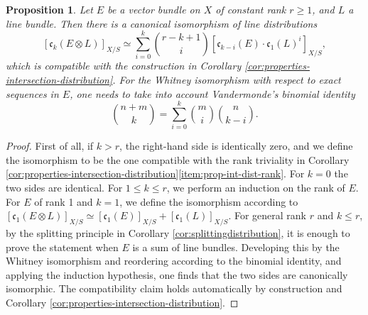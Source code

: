 \documentclass[11pt]{article}
\theoremstyle{plain}
\newtheorem{proposition}[theorem]{Proposition}
\theoremstyle{definition}
\newcommand{\cfrak}{\mathfrak c}
\begin{document}
\begin{proposition}\label{prop:Cherntensorproductwithline}
Let $E$ be a vector bundle on $X$ of constant rank $r\geq 1$, and $L$ a line bundle. Then there is a canonical isomorphism of line distributions
\begin{equation}\label{eq:ck-tensor-product}
[\cfrak_k(E \otimes L)]_{X/S} \simeq \sum_{i=0}^{k} \binom{r-k+1}{i} [\cfrak_{k-i}(E) \cdot \cfrak_1(L)^{i}]_{X/S},
\end{equation}
which is compatible with the construction in Corollary \ref{cor:properties-intersection-distribution}. For the Whitney isomorphism with respect to exact sequences in $E$, one needs to take into account Vandermonde's binomial identity
\begin{displaymath}
\binom{n + m}{k} = \sum_{i=0}^k \binom{m}{i}\binom{n}{k-i}.
\end{displaymath}
\end{proposition}
\begin{proof}
First of all, if $k > r$, the right-hand side is identically zero, and we define the isomorphism to be the one compatible with the rank triviality in Corollary \ref{cor:properties-intersection-distribution}\eqref{item:prop-int-dist-rank}. For $k=0$ the two sides are identical. For $1\leq k\leq r$, we perform an induction on the rank of $E$. For $E$ of rank 1 and $k=1$, we define the isomorphism according to $[\cfrak_{1}(E\otimes L)]_{X/S}\simeq [\cfrak_{1}(E)]_{X/S} + [\cfrak_{1}(L)]_{X/S}$. For general rank $r$ and $k\leq r$, by the splitting principle in Corollary \ref{cor:splittingdistribution}, it is enough to prove the statement when $E$ is a sum of line bundles. Developing this by the Whitney isomorphism and reordering according to the binomial identity, and applying the induction hypothesis, one finds that the two sides are canonically isomorphic. The compatibility claim holds automatically by construction and Corollary \ref{cor:properties-intersection-distribution}.
\end{proof}
\end{document}
